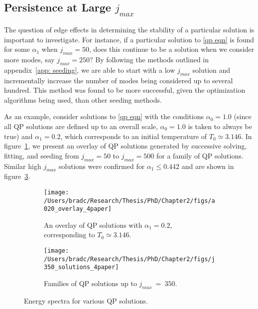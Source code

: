 \documentclass[../PhD.tex]{subfiles}
\begin{document}

\subsection{Persistence at Large $j_{max}$}
\label{ssec: large jmax}

The question of edge effects in determining the stability of a particular solution is important to investigate. For instance, if a particular solution to \eqref{qp eqn} is found for some $\alpha_1$ when $j_{max} = 50$, does this continue to be a solution when we consider more modes, say $j_{max} = 250$? By following the methods outlined in appendix~\ref{app: seeding}, we are able to start with a low $j_{max}$ solution and incrementally increase the number of modes being considered up to several hundred. This method was found to be more successful, given the optimization algorithms being used, than other seeding methods.

As an example, consider solutions to \eqref{qp eqn} with the conditions $\alpha_0 = 1.0$ (since all QP solutions are defined up to an overall scale, $\alpha_0 = 1.0$ is taken to always be true) and $\alpha_1 = 0.2$, which corresponds to an initial temperature of $T_0 \simeq 3.146$. In figure~\ref{fig: a0.2solns}, we present an overlay of QP solutions generated by successive solving, fitting, and seeding from $j_{max} = 50$ to $j_{max}=500$ for a family of QP solutions. Similar high $j_{max}$ solutions were confirmed for $\alpha_1 \leq 0.442$ and are shown in figure~\ref{fig: j350 solutions}.

\begin{figure}[ht]
	\centering
	\begin{subfigure}[t]{0.47\textwidth}
		\texttt{[image: /Users/bradc/Research/Thesis/PhD/Chapter2/figs/a020\_overlay\_4paper]}
		\caption{An overlay of QP solutions with $\alpha_1 = 0.2$, corresponding to $T_0 \simeq 3.146$.}
		\label{fig: a0.2solns}
	\end{subfigure}
	\hfill
	\begin{subfigure}[t]{0.47\textwidth}
		\texttt{[image: /Users/bradc/Research/Thesis/PhD/Chapter2/figs/j350\_solutions\_4paper]}
		\caption{Families of QP solutions up to $j_{max}~=~350$.}
		\label{fig: j350 solutions}
	\end{subfigure}
	\caption[Energy spectra for various QP solutions]{Energy spectra for various QP solutions.}
\end{figure}
\end{document}
